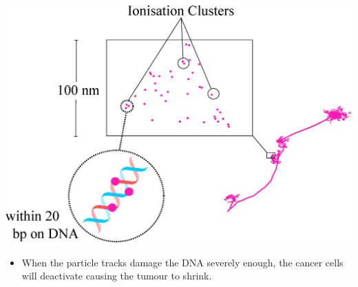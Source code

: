 \documentclass[a3paper,fleqn]{betterposter}
\begin{document}
{\begin{center}
    \includegraphics[scale=0.8]{ionisationcluster_zoomedout.eps}
\end{center}

\begin{itemize}
    \item When the particle tracks damage the DNA severely enough, the cancer cells will deactivate causing the tumour to shrink.
\end{itemize}
\vfill
}
\end{document}
